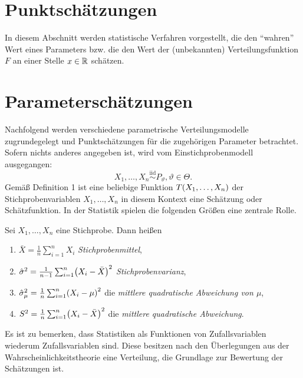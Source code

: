 \documentclass{lecture}
\begin{document}
    \section*{Punktschätzungen}

    In diesem Abschnitt werden statistische Verfahren vorgestellt, die den ``wahren'' Wert eines Parameters bzw. die den Wert der (unbekannten) Verteilungsfunktion \(F\) an einer Stelle \(x \in \mathbb{R}\) schätzen.


    \section*{Parameterschätzungen}

    Nachfolgend werden verschiedene parametrische Verteilungsmodelle zugrundegelegt und Punktschätzungen für die zugehörigen Parameter betrachtet.
    Sofern nichts anderes angegeben ist, wird vom Einstichprobenmodell ausgegangen:
    \[
        X_1, \ldots, X_n \stackrel{\text{iid}}{\sim} P_\vartheta, \vartheta \in \Theta.
    \]
    Gemäß Definition 1 ist eine beliebige Funktion \(T\parentheses*{X_1, \ldots, X_n}\) der Stichprobenvariablen \(X_1, \ldots, X_n\) in diesem Kontext eine Schätzung oder Schätzfunktion.
    In der Statistik spielen die folgenden Größen eine zentrale Rolle.

    \begin{definition}
        Sei \(X_1, \ldots, X_n\) eine Stichprobe.
        Dann heißen
        \begin{enumerate}
            \item \(\bar{X} = \frac{1}{n}\sum_{i = 1}^n X_i\) \emph{Stichprobenmittel},
            \item \(\hat{\sigma}^2 = \frac{1}{n - 1}\sum_{i = 1}^n \parentheses*{X_i - \bar{X}}^2\) \emph{Stichprobenvarianz},
            \item \(\hat{\sigma}_\mu^2 = \frac{1}{n}\sum_{i = 1}^n \parentheses*{X_i - \mu}^2\) die \emph{mittlere quadratische Abweichung von \(\mu\)},
            \item \(S^2 = \frac{1}{n}\sum_{i = 1}^n \parentheses*{X_i - \bar{X}}^2\) die \emph{mittlere quadratische Abweichung}.
        \end{enumerate}
    \end{definition}

    Es ist zu bemerken, dass Statistiken als Funktionen von Zufallsvariablen wiederum Zufallsvariablen sind.
    Diese besitzen nach den Überlegungen aus der Wahrscheinlichkeitstheorie eine Verteilung, die Grundlage zur Bewertung der Schätzungen ist.
\end{document}
